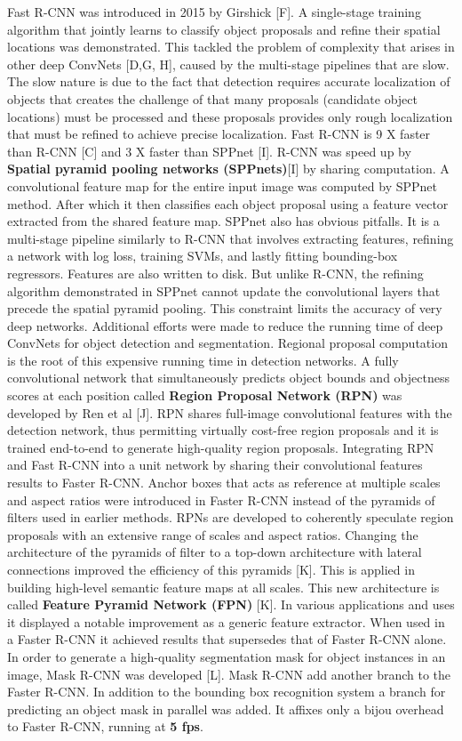 Fast R-CNN was introduced in 2015 by Girshick [F]. A single-stage training algorithm that jointly learns to classify object proposals and refine their spatial locations was demonstrated. This tackled the problem of complexity that arises in other deep ConvNets [D,G, H], caused by the multi-stage pipelines that are slow. The slow nature is due to the fact that detection requires accurate localization of objects that creates the challenge of that many proposals (candidate object locations) must be processed and these proposals provides only rough localization that must be refined to achieve precise localization. Fast R-CNN is 9 X faster than R-CNN [C] and 3 X faster than SPPnet [I]. R-CNN was speed up by \textbf{Spatial pyramid pooling networks (SPPnets)}[I] by sharing computation. A convolutional feature map for the entire input image was computed by SPPnet method. After which it then classifies each object proposal using a feature vector extracted from the shared feature map. SPPnet also has obvious pitfalls. It is a multi-stage pipeline similarly to R-CNN that involves extracting features, refining a network with log loss, training SVMs, and lastly fitting bounding-box regressors. Features are also written to disk. But unlike R-CNN, the refining algorithm demonstrated in SPPnet cannot update the convolutional layers that precede the spatial pyramid pooling. This constraint limits the accuracy of very deep networks.
Additional efforts were made to reduce the running time of deep ConvNets for object detection and segmentation. Regional proposal computation is the root of this expensive running time in detection networks. A fully convolutional network that simultaneously predicts object bounds and objectness scores at each position called \textbf{ Region Proposal Network (RPN) }was developed by Ren et al [J]. RPN shares full-image convolutional features with the detection network, thus permitting virtually cost-free region proposals and it is trained end-to-end to generate high-quality region proposals. Integrating RPN and Fast R-CNN into a unit network by sharing their convolutional features results to Faster R-CNN. Anchor boxes that acts as reference at multiple scales and aspect ratios were introduced in Faster R-CNN instead of the pyramids of filters used in earlier methods. RPNs are developed to coherently speculate region proposals with an extensive range of scales and aspect ratios.
Changing the architecture of the pyramids of filter to a top-down architecture with lateral connections improved the efficiency of this pyramids [K]. This is applied in building high-level semantic feature maps at all scales. This new architecture is called \textbf{ Feature Pyramid Network (FPN)} [K]. In various applications and uses it displayed a notable improvement as a generic feature extractor. When used in a Faster R-CNN it achieved results that supersedes that of Faster R-CNN alone. In order to generate a high-quality segmentation mask for object instances in an image, Mask R-CNN was developed [L]. Mask R-CNN add another branch to the Faster R-CNN. In addition to the bounding box recognition system a branch for predicting an object mask in parallel was added. It affixes only a bijou overhead to Faster R-CNN, running at \textbf{ 5 fps}.

